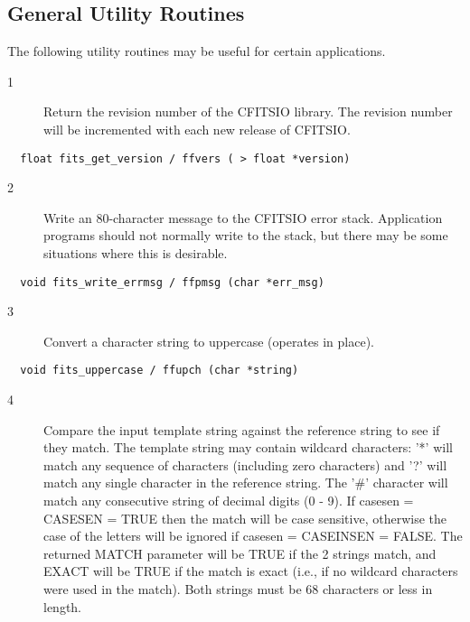 \documentclass[11pt]{book}
\begin{document}
\subsection{General Utility Routines}

The following utility routines may be useful for certain applications.


\begin{description}
\item[1 ] Return the revision number of the CFITSIO library.
    The revision number will be incremented with each new
   release of CFITSIO. \label{ffvers}
\end{description}

\begin{verbatim}
  float fits_get_version / ffvers ( > float *version)
\end{verbatim}

\begin{description}
\item[2 ] Write an 80-character message to the CFITSIO error stack.  Application
    programs should not normally write to the stack, but there may be
   some situations where this is desirable. \label{ffpmsg}
\end{description}

\begin{verbatim}
  void fits_write_errmsg / ffpmsg (char *err_msg)
\end{verbatim}

\begin{description}
\item[3 ] Convert a character string to uppercase (operates in place). \label{ffupch}
\end{description}

\begin{verbatim}
  void fits_uppercase / ffupch (char *string)
\end{verbatim}

\begin{description}
\item[4 ] Compare the input template string against the reference string
    to see if they match.  The template string may contain wildcard
    characters: '*' will match any sequence of characters (including
    zero characters) and '?' will match any single character in the
    reference string.  The '\#' character will match any consecutive string
    of decimal digits (0 - 9).  If casesen = CASESEN = TRUE then the match will
    be case sensitive, otherwise the case of the letters will be ignored
    if casesen = CASEINSEN = FALSE.  The returned MATCH parameter will be
    TRUE if the 2 strings match, and EXACT will be TRUE if the match is
    exact (i.e., if no wildcard characters were used in the match).
   Both strings must be 68 characters or less in length. \label{ffcmps}
\end{description}
\end{document}
